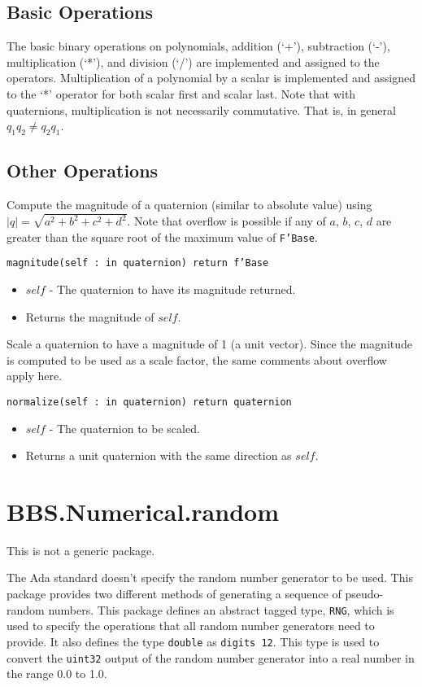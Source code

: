 \documentclass[10pt, openany]{book}
\newcommand{\function}[1]{\texttt{#1}}
\newcommand{\datatype}[1]{\texttt{#1}}
\begin{document}
\subsection{Basic Operations}
The basic binary operations on polynomials, addition (`+'), subtraction (`-'), multiplication (`*'), and division (`/') are implemented and assigned to the operators.  Multiplication of a polynomial by a scalar is implemented and assigned to the `*' operator for both scalar first and scalar last.  Note that with quaternions, multiplication is not necessarily commutative.  That is, in general $q_1 q_2 \neq q_2 q_1$.

\subsection{Other Operations}

Compute the magnitude of a quaternion (similar to absolute value) using $|q| = \sqrt{a^2+b^2+c^2+d^2}$.  Note that overflow is possible if any of $a$, $b$, $c$, $d$ are greater than the square root of the maximum value of \datatype{F'Base}.

\function{magnitude(self : in quaternion) return f'Base}
\begin{itemize}
  \item $self$ - The quaternion to have its magnitude returned.
  \item Returns the magnitude of $self$.
\end{itemize}

Scale a quaternion to have a magnitude of 1 (a unit vector).  Since the magnitude is computed to be used as a scale factor, the same comments about overflow apply here.

\function{normalize(self : in quaternion) return quaternion}
\begin{itemize}
  \item $self$ - The quaternion to be scaled.
  \item Returns a unit quaternion with the same direction as $self$.
\end{itemize}

\section{BBS.Numerical.random}
This is not a generic package.

The Ada standard doesn't specify the random number generator to be used.  This package provides two different methods of generating a sequence of pseudo-random numbers.  This package defines an abstract tagged type, \datatype{RNG}, which is used to specify the operations that all random number generators need to provide.  It also defines the type \datatype{double} as \datatype{digits 12}.  This type is used to convert the \datatype{uint32} output of the random number generator into a real number in the range 0.0 to 1.0.
\end{document}
